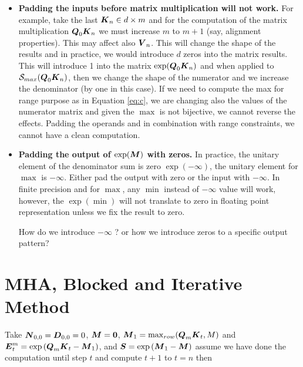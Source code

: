 \documentclass[conference]{IEEEtran}
\begin{document}
\begin{itemize}
  \item {\bf Padding the inputs before matrix multiplication will not
    work.} For example, take the last ${\boldsymbol K}_n \in d\times m$ and for
    the computation of the matrix multiplication ${\boldsymbol Q}_0{\boldsymbol K}_n$ we
    must increase $m$ to $m+1$ (say, alignment properties). This may
    affect also ${\boldsymbol V}_n$.  This will change the shape of the results
    and in practice, we would introduce $d$ zeros into the matrix
    results. This will introduce 1 into the matrix
    $\exp({\boldsymbol Q}_0{\boldsymbol K}_n)$ and when applied to
    $\Smax{\Vc{Q}_0\Vc{K}_n}$, then we change the shape of the
    numerator and we increase the denominator (by one in this
    case). If we need to compute the max for range purpose as in
    Equation \ref{eq:c}, we are changing also the values of the
    numerator matrix and given the $\max$ is not bijective, we cannot
    reverse the effects. Padding the operands and in combination with
    range constraints, we cannot have a clean computation.

  \item {\bf Padding the output of $\exp({\boldsymbol M})$ with zeros.}  In
    practice, the unitary element of the denominator sum is zero
    $\exp(-\infty)$, the unitary element for $\max$ is $-\infty$.
    Either pad the output with zero or the input with $-\infty$. In
    finite precision and for $\max$, any $\min$ instead of $-\infty$
    value will work, however, the $\exp(\min)$ will not translate to
    zero in floating point representation unless we fix the result to
    zero.

    How do we introduce $-\infty$ ? or how we introduce zeros to a
    specific output pattern?

 
    
    

\end{itemize}







\section{MHA, Blocked and  Iterative Method}
\label{sec:iterative}
Take ${\boldsymbol N}_{0,0}= {\boldsymbol D}_{0,0}=0$, ${\boldsymbol M} = {\boldsymbol 0}$, ${\boldsymbol M}_1 =
\max_{row} ({\boldsymbol Q}_m{\boldsymbol K}_{t}, M)$ and
${\boldsymbol E}_t^m=\exp{({\boldsymbol Q}_m{\boldsymbol K}_{t}-{\boldsymbol M}_1)}$, and ${\boldsymbol S}
=\exp{({\boldsymbol M}_1 - {\boldsymbol M})}$ assume we have done the computation until
step $t$ and compute $t+1$ to $t=n$ then
\end{document}
